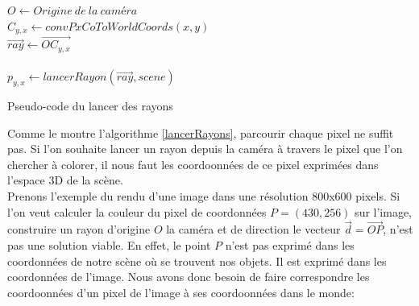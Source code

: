 \documentclass[11pt]{article}
\begin{document}
\begin {algorithm}[H]
	\DontPrintSemicolon

	$O \gets Origine\ de\ la\ caméra$\\
	{
		{
			$C_{y, x} \gets convPxCoToWorldCoords(x, y)$\\
			$\overrightarrow{ray} \gets \overrightarrow{OC_{y,x}}$\\
			\hfill\\
			$p_{y, x} \gets lancerRayon(\overrightarrow{ray}, scene)$
		}
	}

	\caption{Pseudo-code du lancer des rayons}
	\label{lancerRayons}
\end {algorithm}

Comme le montre l'algorithme \ref{lancerRayons}, parcourir chaque pixel ne suffit pas. Si l'on souhaite lancer un rayon depuis la caméra à travers le pixel que l'on chercher à colorer, il nous faut les coordoonnées de ce pixel exprimées dans l'espace 3D de la scène.\\
Prenons l'exemple du rendu d'une image dans une résolution 800x600 pixels. Si l'on veut calculer la couleur du pixel de coordonnées $P = (430, 256)$ sur l'image, construire un rayon d'origine $O$ la caméra et de direction le vecteur $\overrightarrow{d} = \overrightarrow{OP}$, n'est pas une solution viable. En effet, le point $P$ n'est pas exprimé dans les coordonnées de notre scène où se trouvent nos objets. Il est exprimé dans les coordonnées de l'image. Nous avons donc besoin de faire correspondre les coordoonnées d'un pixel de l'image à ses coordoonnées dans le monde:
\end{document}
